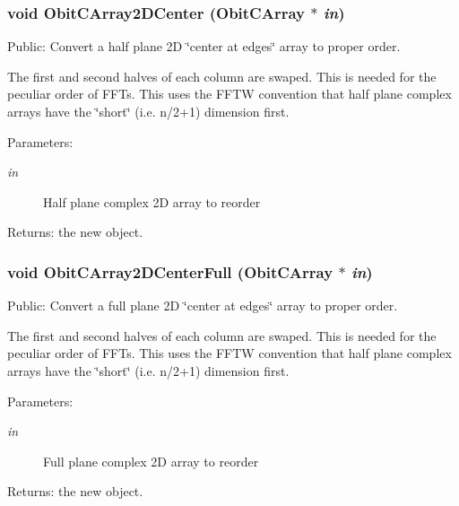 \subsubsection{\setlength{\rightskip}{0pt plus 5cm}void Obit\-CArray2DCenter ({\bf Obit\-CArray} $\ast$ {\em in})}\label{ObitCArray_8h_a68}


Public: Convert a half plane 2D \char`\"{}center at edges\char`\"{} array to proper order. 

The first and second halves of each column are swaped. This is needed for the peculiar order of FFTs. This uses the FFTW convention that half plane complex arrays have the \char`\"{}short\char`\"{} (i.e. n/2+1) dimension first. \begin{Desc}
\item[Parameters:]
\begin{description}
\item[{\em in}]Half plane complex 2D array to reorder \end{description}
\end{Desc}
\begin{Desc}
\item[Returns:]the new object. \end{Desc}
\subsubsection{\setlength{\rightskip}{0pt plus 5cm}void Obit\-CArray2DCenter\-Full ({\bf Obit\-CArray} $\ast$ {\em in})}\label{ObitCArray_8h_a69}


Public: Convert a full plane 2D \char`\"{}center at edges\char`\"{} array to proper order. 

The first and second halves of each column are swaped. This is needed for the peculiar order of FFTs. This uses the FFTW convention that half plane complex arrays have the \char`\"{}short\char`\"{} (i.e. n/2+1) dimension first. \begin{Desc}
\item[Parameters:]
\begin{description}
\item[{\em in}]Full plane complex 2D array to reorder \end{description}
\end{Desc}
\begin{Desc}
\item[Returns:]the new object. \end{Desc}
